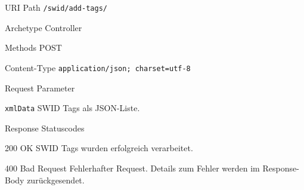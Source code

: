 \documentclass[10pt,a4paper]{scrartcl}
\begin{document}
\begin{mdframed}[style=def]
\begin{description*}
	\item[URI Path] \texttt{/swid/add-tags/}
	\item[Archetype] Controller
	\item[Methods] POST
	\item[Content-Type] \texttt{application/json; charset=utf-8}
	\item[Request Parameter] \hfill
		\begin{description*}
			\item[\texttt{xmlData}] SWID Tags als JSON-Liste.
		\end{description*}
	\item[Response Statuscodes] \hfill
		\begin{description*}
			\item[200 OK] SWID Tags wurden erfolgreich verarbeitet.
			\item[400 Bad Request] Fehlerhafter Request. Details zum Fehler werden im
				Response-Body zurückgesendet.
		\end{description*}
\end{description*}
\end{mdframed}
\end{document}
